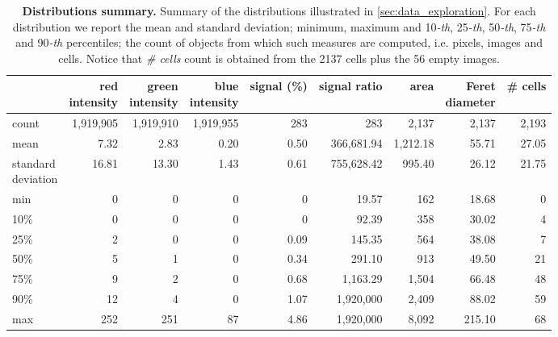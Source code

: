\begin{table}[]
{    \begin{tabular}{lrrrrrrrr}
    \toprule
    {} &          \thead{red\\intensity} &        \thead{green\\intensity} &         \thead{blue\\intensity} &  signal (\%) &  signal ratio &     area &  \thead{Feret\\diameter} &  \# cells \\
    \midrule
    count & 1,919,905 & 1,919,910 & 1,919,955 &      283 &        283 & 2,137 &        2,137 & 2,193 \\
    mean  &         7.32 &         2.83 &         0.20 &        0.50 &    366,681.94 & 1,212.18 &           55.71 &    27.05 \\
    \thead{standard\\deviation}   &        16.81 &        13.30 &         1.43 &        0.61 &    755,628.42 &   995.40 &           26.12 &    21.75 \\
    min   &         0 &         0 &         0 &        0 &         19.57 &   162 &           18.68 &     0 \\
    10\%   &         0 &         0 &         0 &        0 &         92.39 &   358 &           30.02 &     4 \\
    25\%   &         2 &         0 &         0 &        0.09 &        145.35 &   564 &           38.08 &     7 \\
    50\%   &         5 &         1 &         0 &        0.34 &        291.10 &   913 &           49.50 &    21 \\
    75\%   &         9 &         2 &         0 &        0.68 &      1,163.29 & 1,504 &           66.48 &    48 \\
    90\%   &        12 &         4 &         0 &        1.07 &  1,920,000 & 2,409 &           88.02 &    59 \\
    max   &       252 &       251 &        87 &        4.86 &  1,920,000 & 8,092 &          215.10 &    68 \\
    \bottomrule
    \end{tabular}
    }
    \caption{\textbf{Distributions summary.} 
    Summary of the distributions illustrated in \cref{sec:data_exploration}. For each distribution we report the mean and standard deviation; minimum, maximum and 10\textit{-th}, 25\textit{-th}, 50\textit{-th}, 75\textit{-th} and 90\textit{-th} percentiles; the count of objects from which such measures are computed, i.e. pixels, images and cells.
    Notice that \textit{\# cells} count is obtained from the 2137 cells plus the 56 empty images.
    }
    \label{tab:data_features}
\end{table}





